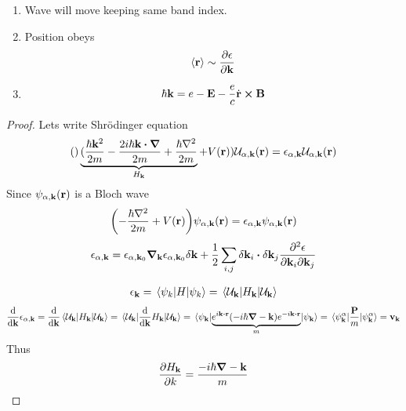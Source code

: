 \begin{prop}
	
	\begin{enumerate}
		\item Wave will move keeping same band index.
		\item Position obeys 
		\begin{align}
		\expval{\vb{r}} \sim \pdv{\epsilon}{\vb{k}}
		\end{align}
		\item 
		\begin{align}
		\hbar \vb{k} = e-\vb{E} - \frac{e}{c} \dot{\vb{r}} \cross \vb{B}
		\end{align}
	\end{enumerate}
\begin{proof}
	Lets write Shr\"{o}dinger equation
	\begin{align}
	\qty\underbrace{(\frac{\hbar \vb{k}^2}{2m}-\frac{2i\hbar \vb{k} \vdot \vb{\grad}}{2m}+\frac{\hbar \laplacian}{2m}}_{H_{\vb{k}}} + V(\vb{r})) \mathcal{U}_{\alpha, \vb{k}}(\vb{r}) = \epsilon_{\alpha, \vb{k}}\mathcal{U}_{\alpha, \vb{k}}(\vb{r}) 
	\end{align}
	Since $\psi_{\alpha, \vb{k}}(\vb{r}) $ is a Bloch wave
	\begin{align}
	\qty(-\frac{\hbar \laplacian}{2m} + V(\vb{r})) \psi_{\alpha, \vb{k}}(\vb{r}) = \epsilon_{\alpha, \vb{k}}\psi_{\alpha, \vb{k}}(\vb{r}) 
	\end{align}
	\begin{align}
	\epsilon_{\alpha, \vb{k}} = \epsilon_{\alpha, \vb{k}_0} \grad_{\vb{k}}\epsilon_{\alpha, \vb{k}_0} \delta \vb{k} + \frac{1}{2} \sum_{i,j} \delta \vb{k}_i \vdot \delta \vb{k}_j \pdv{\epsilon}{\vb{k}_i }{\vb{k}_j}
	\end{align}
	
	\begin{align}
	\epsilon_{\vb{k}} = \ev{H}{\psi_k} = \ev{H_{\vb{k}}}{\mathcal{U}_{\vb{k}}}
	\end{align}
	\begin{align}
	\dv{\vb{k}}\epsilon_{\alpha, \vb{k}} = \dv{\vb{k}}\ev{H_{\vb{k}}}{\mathcal{U}_{\vb{k}}} =  \ev{\dv{\vb{k}}H_{\vb{k}}}{\mathcal{U}_{\vb{k}}} = \ev{\underbrace{e^{i\vb{k}\vdot \vb{r}}\qty(-i\hbar \grad -\vb{k} )e^{-i\vb{k}\vdot \vb{r}}}_m}{\psi_{\vb{k}}}= \ev{\frac{\vb{P}}{m}}{\psi^\alpha_{\vb{k}}} = \vb{v}_{\vb{k}}
	\end{align}
	Thus
	\begin{align}
	\pdv{H_{\vb{k}}}{k} = \frac{-i\hbar \grad -\vb{k}}{m}
	\end{align}
	

\end{proof}
\end{prop}
